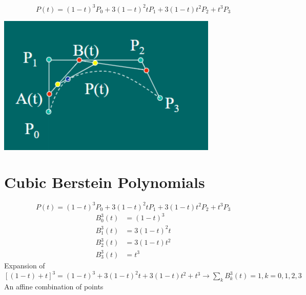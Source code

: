 \documentclass{article}
\begin{document}
\[P(t) = (1 - t)^3 P_0 + 3(1 - t)^2 t P_1 + 3(1 - t) t^2 P_2 + t^3 P_3\]
\begin{center}
    \includegraphics*[scale=1]{W3_4.png}
\end{center}

\section*{Cubic Berstein Polynomials}
\[P(t) = (1 - t)^3 P_0 + 3(1-t)^2 t P_1 + 3(1 - t) t^2 P_2 + t^3 P_3\]
\begin{align*}
B^3_0 (t) &= (1-t)^3\\
B^3_1 (t) &= 3(1-t)^2 t\\
B^3_2 (t) &= 3(1-t) t^2\\
B^3_3 (t) &= t^3
\end{align*}
Expansion of $[(1-t) + t]^3 = (1-t)^3 + 3(1 - t)^2 t + 3(1-t) t^2 + t^3 \rightarrow \sum_k B^3_k (t) = 1, k = 0, 1, 2, 3$\\
An affine combination of points
\end{document}

